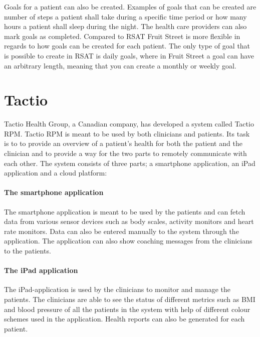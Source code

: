 \documentclass{cslthse-msc}
\begin{document}
Goals for a patient can also be created. Examples of goals that can be created are number of steps a patient shall take during a specific time period or how many hours a patient shall sleep during the night. The health care providers can also mark goals as completed. Compared to RSAT Fruit Street is more flexible in regards to how goals can be created for each patient. The only type of goal that is possible to create in RSAT is daily goals, where in Fruit Street a goal can have an arbitrary length, meaning that you can create a monthly or weekly goal. 


\section{Tactio}
Tactio Health Group, a Canadian company, has developed a system called Tactio RPM. Tactio RPM is meant to be used by both clinicians and patients. Its task is to to provide an overview of a patient's health for both the patient and the clinician and to provide a way for the two parts to remotely communicate with each other. The system consists of three parts; a smartphone application, an iPad application and a cloud platform: 

\paragraph{The smartphone application} The smartphone application is meant to be used by the patients and can fetch data from various sensor devices such as body scales, activity monitors and heart rate monitors. Data can also be entered manually to the system through the application. The application can also show coaching messages from the clinicians to the patients.

\paragraph{The iPad application} The iPad-application is used by the clinicians to monitor and manage the patients. The clinicians are able to see the status of different metrics such as BMI and blood pressure of all the patients in the system with help of different colour schemes used in the application. Health reports can also be generated for each patient. 
\end{document}

